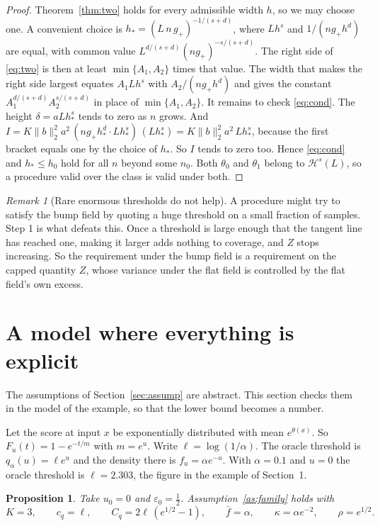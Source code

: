 \documentclass[11pt]{article}
\newtheorem{proposition}[theorem]{Proposition}
\theoremstyle{definition}
\theoremstyle{remark}
\newtheorem{remark}[theorem]{Remark}
\begin{document}
\begin{proof}
Theorem~\ref{thm:two} holds for every admissible width $h$, so we may choose one. A
convenient choice is $h_*=(L\,n\,g_+)^{-1/(s+d)}$, where $Lh^s$ and $1/(n g_+h^d)$ are
equal, with common value $L^{d/(s+d)}(ng_+)^{-s/(s+d)}$. The right side of \eqref{eq:two}
is then at least $\min\{A_1,A_2\}$ times that value. The width that makes the right side
largest equates $A_1Lh^s$ with $A_2/(ng_+h^d)$ and gives the constant
$A_1^{d/(s+d)}A_2^{s/(s+d)}$ in place of $\min\{A_1,A_2\}$. It remains to
check \eqref{eq:cond}. The height $\delta=aLh_*^s$ tends to zero as $n$ grows. And
$I=K\|b\|_2^2a^2\,(n g_+h_*^d\cdot Lh_*^s)\,(Lh_*^s)=K\|b\|_2^2a^2\,Lh_*^s$, because the
first bracket equals one by the choice of $h_*$. So $I$ tends to zero too. Hence
\eqref{eq:cond} and $h_*\le h_0$ hold for all $n$ beyond some $n_0$. Both $\theta_0$ and
$\theta_1$ belong to $\mathcal H^s(L)$, so a procedure valid over the class is valid under
both.
\end{proof}

\begin{remark}[Rare enormous thresholds do not help]
A procedure might try to satisfy the bump field by quoting a huge threshold on a small
fraction of samples. Step 1 is what defeats this. Once a threshold is large enough that the
tangent line has reached one, making it larger adds nothing to coverage, and $Z$ stops
increasing. So the requirement under the bump field is a requirement on the capped quantity
$Z$, whose variance under the flat field is controlled by the flat field's own excess.
\end{remark}

\section{A model where everything is explicit}\label{sec:exp}

The assumptions of Section~\ref{sec:assump} are abstract. This section checks them in the
model of the example, so that the lower bound becomes a number.

Let the score at input $x$ be exponentially distributed with mean $e^{\theta(x)}$. So
$F_u(t)=1-e^{-t/m}$ with $m=e^u$. Write $\ell=\log(1/\alpha)$. The oracle threshold is
$q_\alpha(u)=\ell e^u$ and the density there is $f_u=\alpha e^{-u}$. With $\alpha=0.1$ and
$u=0$ the oracle threshold is $\ell=2.303$, the figure in the example of Section~1.

\begin{proposition}\label{prop:exp}
Take $u_0=0$ and $\varepsilon_0=\tfrac12$. Assumption~\ref{as:family} holds with
\[
  K=3,\qquad c_q=\ell,\qquad C_q=2\ell\,(e^{1/2}-1),\qquad
  \bar f=\alpha,\qquad \kappa=\alpha e^{-2},\qquad \rho=e^{1/2}.
\]
\end{proposition}
\end{document}
